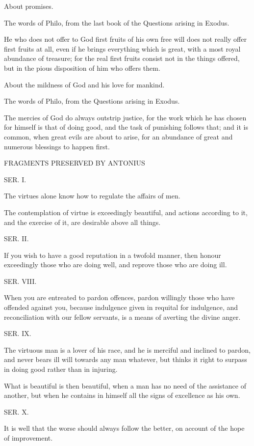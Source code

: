 About promises.

The words of Philo, from the last book of the Questions arising in Exodus.

He who does not offer to God first fruits of his own free will does not really offer first fruits at all,
even if he brings everything which is great, with a most royal abundance of treasure; for the real
first fruits consist not in the things offered, but in the pious disposition of him who offers them.

About the mildness of God and his love for mankind.

The words of Philo, from the Questions arising in Exodus.

The mercies of God do always outstrip justice, for the work which he has chosen for himself is that
of doing good, and the task of punishing follows that; and it is common, when great evils are about
to arise, for an abundance of great and numerous blessings to happen first.

FRAGMENTS PRESERVED BY ANTONIUS

SER. I.

The virtues alone know how to regulate the affairs of men.

The contemplation of virtue is exceedingly beautiful, and actions according to it, and the exercise
of it, are desirable above all things.

SER. II.

If you wish to have a good reputation in a twofold manner, then honour exceedingly those who are
doing well, and reprove those who are doing ill.

SER. VIII.

When you are entreated to pardon offences, pardon willingly those who have offended against
you, because indulgence given in requital for indulgence, and reconciliation with our fellow
servants, is a means of averting the divine anger.

SER. IX.

The virtuous man is a lover of his race, and he is merciful and inclined to pardon, and never bears
ill will towards any man whatever, but thinks it right to surpass in doing good rather than in injuring.

What is beautiful is then beautiful, when a man has no need of the assistance of another, but when
he contains in himself all the signs of excellence as his own.

SER. X.

It is well that the worse should always follow the better, on account of the hope of improvement.


